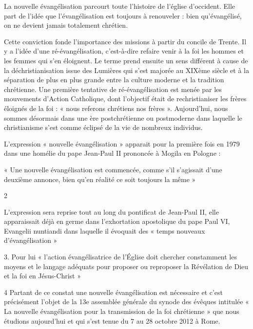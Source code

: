 \begin{Def}
    La nouvelle évangélisation parcourt toute l’histoire de l’église d’occident. Elle part de l’idée que
l’évangélisation est toujours à renouveler : bien qu’évangélisé, on ne devient jamais totalement
chrétien. 
\end{Def}
Cette conviction fonde l’importance des missions à partir du concile de Trente. Il y a l’idée
d’une ré-évangélisation, c’est-à-dire refaire venir à la foi les hommes et les femmes qui s’en éloignent.
Le terme prend ensuite un sens différent à cause de la déchristianisation issue des Lumières qui s’est
majorée au XIXème siècle et à la séparation de plus en plus grande entre la culture moderne et la
tradition chrétienne.
Une première tentative de ré-évangélisation est menée par les mouvements d’Action Catholique, dont
l’objectif était de rechristianiser les frères éloignés de la foi : « nous referons chrétiens nos frères ».
Aujourd’hui, nous sommes désormais dans une ère postchrétienne ou postmoderne dans laquelle le
christianisme s’est comme éclipsé de la vie de nombreux individus.
 
L’expression « nouvelle évangélisation » apparait pour la première fois en 1979 dans une homélie du
pape Jean-Paul II prononcée à Mogila en Pologne : \begin{singlequote}
« Une nouvelle évangélisation est commencée,
comme s'il s'agissait d'une deuxième annonce, bien qu'en réalité ce soit toujours la même » 

2
\end{singlequote}
L’expression sera reprise tout au long du pontificat de Jean-Paul II, elle apparaissait déjà en germe
dans l’exhortation apostolique du pape Paul VI, Evangelii nuntiandi dans laquelle il évoquait des
« temps nouveaux d’évangélisation »

3. Pour lui « l’action évangélisatrice de l’Église doit chercher
constamment les moyens et le langage adéquats pour proposer ou reproposer la Révélation de Dieu
et la foi en Jésus-Christ »

4
Partant de ce constat une nouvelle évangélisation est nécessaire et c’est précisément l’objet de la 13e
assemblée générale du synode des évêques intitulée « La nouvelle évangélisation pour la transmission
de la foi chrétienne » que nous étudions aujourd’hui et qui s’est tenue du 7 au 28 octobre 2012 à
Rome.
